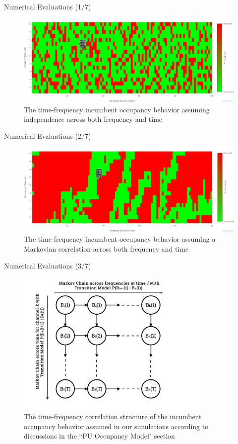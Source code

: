 \documentclass{beamer}
\begin{document}
\begin{frame}{Numerical Evaluations (1/7)}
    \begin{figure}
    \centering
    \includegraphics[width = 1.0\textwidth]{Independence_1.PNG}
    \caption{The time-frequency incumbent occupancy behavior assuming independence across both frequency and time}
    \label{fig:29}
\end{figure}
\end{frame}
\begin{frame}{Numerical Evaluations (2/7)}
    \begin{figure}
    \centering
    \includegraphics[width = 1.0\textwidth]{Space_Time_Corr_1.PNG}
    \caption{The time-frequency incumbent occupancy behavior assuming a Markovian correlation across both frequency and time}
    \label{fig:30}
\end{figure}
\end{frame}
\begin{frame}{Numerical Evaluations (3/7)}
    \begin{figure}
    \centering
    \includegraphics[width = 0.85\textwidth]{MarkovChainsVisualization.png}
    \caption{The time-frequency correlation structure of the incumbent occupancy behavior assumed in our simulations according to discussions in the ``PU Occupancy Model" section}
    \label{fig:31}
\end{figure}
\end{frame}
\end{document}
